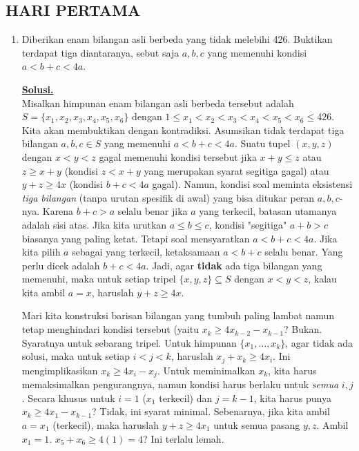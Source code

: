 \documentclass[12pt,twoside]{article}
\newenvironment{solution}
{
	\par\noindent\textbf{\underline{Solusi.}}\\
}
{
	\par
}
\begin{document}
\subsection{HARI PERTAMA}
\begin{enumerate}
  \item Diberikan enam bilangan asli berbeda
        yang tidak melebihi 426. Buktikan terdapat tiga diantaranya, sebut saja $a,b,c$ yang memenuhi kondisi $a<b+c<4a$.
        \begin{solution}
          Misalkan himpunan enam bilangan asli berbeda tersebut adalah $S = \{x_1, x_2, x_3, x_4, x_5, x_6\}$ dengan $1 \le x_1 < x_2 < x_3 < x_4 < x_5 < x_6 \le 426$.
          Kita akan membuktikan dengan kontradiksi. Asumsikan tidak terdapat tiga bilangan $a, b, c \in S$ yang memenuhi $a < b+c < 4a$.
          Suatu tupel $(x, y, z)$ dengan $x < y < z$ gagal memenuhi kondisi tersebut jika $x+y \le z$ atau $z \ge x+y$ (kondisi $z < x+y$ yang merupakan syarat segitiga gagal) atau $y+z \ge 4x$ (kondisi $b+c < 4a$ gagal).
          Namun, kondisi soal meminta eksistensi \textit{tiga bilangan} (tanpa urutan spesifik di awal) yang bisa ditukar peran $a, b, c$-nya. Karena $b+c > a$ selalu benar jika $a$ yang terkecil, batasan utamanya adalah sisi atas.
          Jika kita urutkan $a \le b \le c$, kondisi "segitiga" $a+b > c$ biasanya yang paling ketat. Tetapi soal mensyaratkan $a < b+c < 4a$.
          Jika kita pilih $a$ sebagai yang terkecil, ketaksamaan $a < b+c$ selalu benar. Yang perlu dicek adalah $b+c < 4a$.
          Jadi, agar \textbf{tidak} ada tiga bilangan yang memenuhi, maka untuk setiap tripel $\{x,y,z\} \subseteq S$ dengan $x<y<z$, kalau kita ambil $a=x$, haruslah $y+z \ge 4x$.

          Mari kita konstruksi barisan bilangan yang tumbuh paling lambat namun tetap menghindari kondisi tersebut (yaitu $x_{k} \ge 4x_{k-2} - x_{k-1}$? Bukan. Syaratnya untuk sebarang tripel.
          Untuk himpunan $\{x_1, \dots, x_k\}$, agar tidak ada solusi, maka untuk setiap $i < j < k$, haruslah $x_j + x_k \ge 4x_i$. Ini mengimplikasikan $x_k \ge 4x_i - x_j$.
          Untuk meminimalkan $x_k$, kita harus memaksimalkan pengurangnya, namun kondisi harus berlaku untuk \textit{semua} $i, j$. Secara khusus untuk $i=1$ ($x_1$ terkecil) dan $j=k-1$, kita harus punya $x_k \ge 4x_1 - x_{k-1}$? Tidak, ini syarat minimal.
          Sebenarnya, jika kita ambil $a=x_1$ (terkecil), maka haruslah $y+z \ge 4x_1$ untuk semua pasang $y,z$.
          Ambil $x_1 = 1$.
          $x_5 + x_6 \ge 4(1) = 4$? Ini terlalu lemah.


\end{solution}
\end{enumerate}
\end{document}

